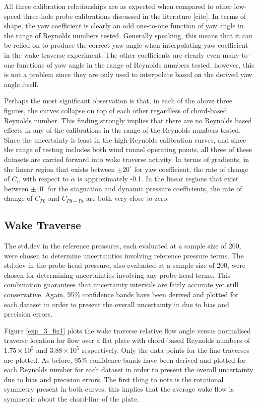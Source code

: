 \documentclass[11pt,a4paper,twocolumn]{article}
\begin{document}
All three calibration relationships are as expected when compared to other low-speed three-hole probe calibrations discussed in the literature [cite]. In terms of shape, the yaw coefficient is clearly an odd one-to-one function of yaw angle in the range of Reynolds numbers tested. Generally speaking, this means that it can be relied on to produce the correct yaw angle when interpolating yaw coefficient in the wake traverse experiment. The other coefficients are clearly even many-to-one functions of yaw angle in the range of Reynolds numbers tested, however, this is not a problem since they are only used to interpolate based on the derived yaw angle itself. 

Perhaps the most significant observation is that, in each of the above three figures, the curves collapse on top of each other regardless of chord-based Reynolds number. This finding strongly implies that there are no Reynolds based effects in any of the calibrations in the range of the Reynolds numbers tested. Since the uncertainty is least in the high-Reynolds calibration curves, and since the range of testing includes both wind tunnel operating points, all three of these datasets are carried forward into wake traverse activity. In terms of gradients, in the linear region that exists between $\pm 20 ^\circ$ for yaw coefficient, the rate of change of $C_\alpha$ with respect to $\alpha$ is approximately -0.1. In the linear regions that exist between $\pm 10 ^\circ$ for the stagnation and dynamic pressure coefficients, the rate of change of $C_{P0}$ and $C_{P0 - Ps}$ are both very close to zero. 

\subsection{Wake Traverse}
The std.dev in the reference pressures, each evaluated at a sample size of 200, were chosen to determine uncertainties involving reference pressure terms. The std.dev in the probe-head pressure, also evaluated at a sample size of 200, were chosen for determining uncertainties involving any probe-head terms. This combination guarantees that uncertainty intervals are fairly accurate yet still conservative. Again, 95\% confidence bands have been derived and plotted for each dataset in order to present the overall uncertainty in due to bias and precision errors.

Figure \ref{exp_3_fig1} plots the wake traverse relative flow angle versus normalised traverse location for flow over a flat plate with chord-based Reynolds numbers of $1.75 \times 10^5$ and $3.88 \times 10^5$ respectively. Only the data points for the fine traverses are plotted. As before, 95\% confidence bands have been derived and plotted for each Reynolds number for each dataset in order to present the overall uncertainty due to bias and precision errors. The first thing to note is the rotational symmetry present in both curves; this implies that the average wake flow is symmetric about the chord-line of the plate. 
\end{document}
